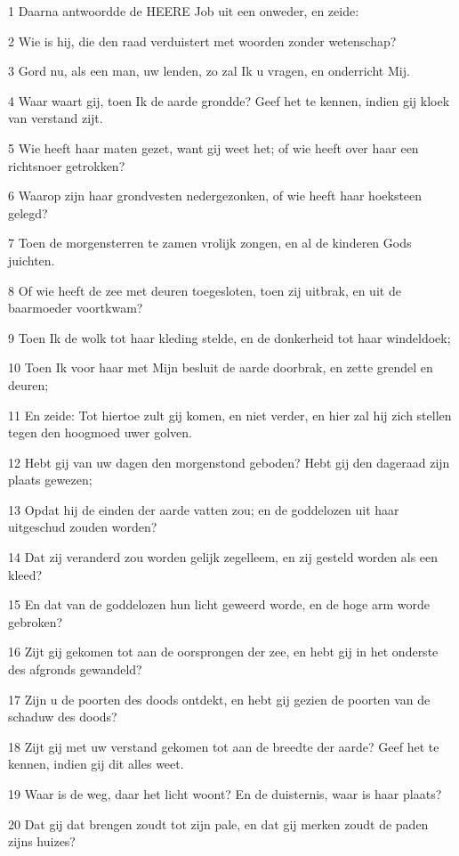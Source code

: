 \par 1 Daarna antwoordde de HEERE Job uit een onweder, en zeide:
\par 2 Wie is hij, die den raad verduistert met woorden zonder wetenschap?
\par 3 Gord nu, als een man, uw lenden, zo zal Ik u vragen, en onderricht Mij.
\par 4 Waar waart gij, toen Ik de aarde grondde? Geef het te kennen, indien gij kloek van verstand zijt.
\par 5 Wie heeft haar maten gezet, want gij weet het; of wie heeft over haar een richtsnoer getrokken?
\par 6 Waarop zijn haar grondvesten nedergezonken, of wie heeft haar hoeksteen gelegd?
\par 7 Toen de morgensterren te zamen vrolijk zongen, en al de kinderen Gods juichten.
\par 8 Of wie heeft de zee met deuren toegesloten, toen zij uitbrak, en uit de baarmoeder voortkwam?
\par 9 Toen Ik de wolk tot haar kleding stelde, en de donkerheid tot haar windeldoek;
\par 10 Toen Ik voor haar met Mijn besluit de aarde doorbrak, en zette grendel en deuren;
\par 11 En zeide: Tot hiertoe zult gij komen, en niet verder, en hier zal hij zich stellen tegen den hoogmoed uwer golven.
\par 12 Hebt gij van uw dagen den morgenstond geboden? Hebt gij den dageraad zijn plaats gewezen;
\par 13 Opdat hij de einden der aarde vatten zou; en de goddelozen uit haar uitgeschud zouden worden?
\par 14 Dat zij veranderd zou worden gelijk zegelleem, en zij gesteld worden als een kleed?
\par 15 En dat van de goddelozen hun licht geweerd worde, en de hoge arm worde gebroken?
\par 16 Zijt gij gekomen tot aan de oorsprongen der zee, en hebt gij in het onderste des afgronds gewandeld?
\par 17 Zijn u de poorten des doods ontdekt, en hebt gij gezien de poorten van de schaduw des doods?
\par 18 Zijt gij met uw verstand gekomen tot aan de breedte der aarde? Geef het te kennen, indien gij dit alles weet.
\par 19 Waar is de weg, daar het licht woont? En de duisternis, waar is haar plaats?
\par 20 Dat gij dat brengen zoudt tot zijn pale, en dat gij merken zoudt de paden zijns huizes?
